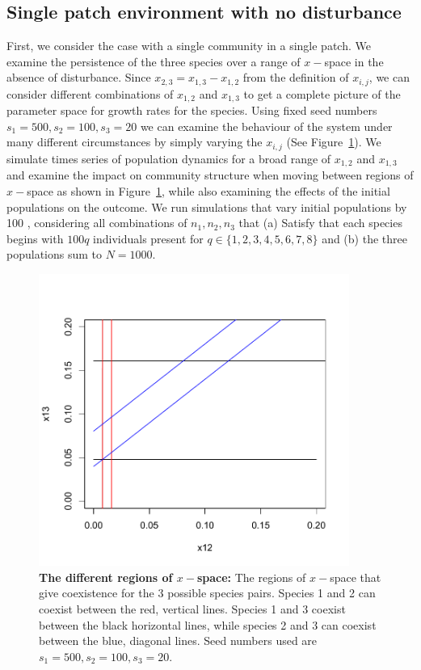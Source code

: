 \subsection{Single patch environment with no disturbance}
First, we consider the case with a single community in a single patch. We examine the persistence of the three species over a range of $x-$space in the absence of disturbance. Since $x_{2,3}=x_{1,3}-x_{1,2}$ from the definition of $x_{i,j}$, we can consider different combinations of 
$x_{1,2}$ and $x_{1,3}$ to get a complete picture of the parameter space for growth rates for the species. Using fixed seed numbers $s_1=500,s_2=100,s_3=20$ we can examine the behaviour of the system under many different circumstances by simply varying the $x_{i,j}$ (See Figure~\ref{xregions}). We simulate times series of population dynamics for a broad range of $x_{1,2}$ and $x_{1,3}$ and examine the impact on community structure when moving between regions of $x-$space as shown in Figure~\ref{xregions}, while also examining the effects of the initial populations on the outcome. We run simulations that vary initial populations by 100 , considering all combinations of $n_1,n_2,n_3$ that (a) Satisfy that each species begins with $100q$ individuals present for $q \in \{1,2,3,4,5,6,7,8\}$ and (b) the three populations sum to $N=1000$. 
\begin{figure}[htbp]
\begin{center}
\includegraphics[width=4in]{3dxchoices.pdf}
\caption[The different regions of $x-$space]{\textbf{The different regions of $x-$space:} The regions of $x-$space that give coexistence for the 3 possible species pairs. Species 1 and 2 can coexist between the red, vertical lines. Species 1 and 3 coexist between the black horizontal lines, while species 2 and 3 can coexist between the blue, diagonal lines. Seed numbers used are $s_1=500,s_2=100,s_3=20$.}
\label{xregions}
\end{center}
\end{figure}
